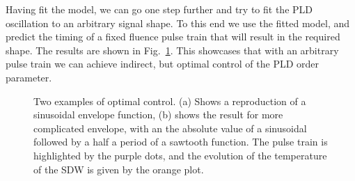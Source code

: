 Having fit the model, we can go one step further and try to fit the PLD oscillation to an arbitrary signal shape. To this end we use the fitted model, and predict the timing of a fixed fluence pulse train that will result in the required shape. The results are shown in Fig.~\ref{fig:Cr_control}. This showcases that with an arbitrary pulse train we can achieve indirect, but optimal control of the PLD order parameter.
\begin{figure}
	\caption{\label{fig:Cr_control} Two examples of optimal control. (a) Shows a reproduction of a sinusoidal envelope function, (b) shows the result for more complicated envelope, with an the absolute value of a sinusoidal followed by a half a period of a sawtooth function. The pulse train is highlighted by the purple dots, and the evolution of the temperature of the SDW is given by the orange plot.}
\end{figure}



